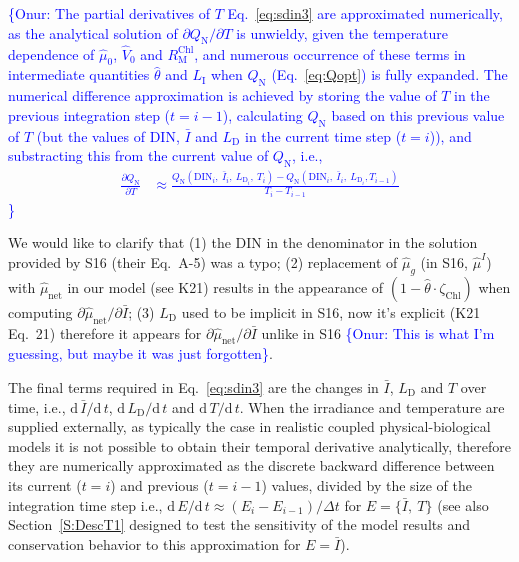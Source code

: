\documentclass[gmd, manuscript]{copernicus}
\newcommand{\onur}[1]{\textcolor{blue}{\{Onur: #1\}}}
\begin{document}
\onur{
The partial derivatives of $T$ Eq.~\eqref{eq:sdin3} are approximated numerically, as the analytical solution of $\partial Q_{\text{N}}/\partial T$ is unwieldy, given the temperature dependence of $\hat{\mu}_0$,  $\hat{V}_0$ and $R_{\text{M}}^{\text{Chl}}$, and numerous occurrence of these terms in intermediate quantities $\hat{\theta}$ and $L_{\text{I}}$ when $Q_{\text{N}}$ (Eq.~\ref{eq:Qopt}) is fully expanded. The numerical difference approximation is achieved by storing the value of $T$ in the previous integration step ($t=i-1$), calculating $Q_{\text{N}}$ based on this previous value of $T$ (but the values of DIN, $\bar{I}$ and $L_{\text{D}}$ in the current time step ($t=i$)), and substracting this from the current value of $Q_{\text{N}}$, i.e.,
\begin{align}
 \frac{\partial Q_{\text{N}}}{\partial T} & \approx
 \frac{Q_{\text{N}}(\text{DIN}_{i},\ \bar{I}_{i},\ L_{\text{D}_i},\ T_{i}) - Q_{\text{N}}(\text{DIN}_{i},\ \bar{I}_{i},\ L_{\text{D}_i},T_{i-1})} {T_{i} - T_{i-1}} 
\end{align}
}

We would like to clarify that (1) the DIN in the denominator in the solution provided by S16 (their Eq.~A-5) was a typo; (2) replacement of $\hat{\mu}_g$ (in S16, $\hat{\mu}^I$) with $\hat{\mu}_{\text{net}}$ in our model (see K21) results in the appearance of $(1-\hat{\theta} \cdot \zeta_{\text{Chl}})$ when computing $\partial \hat{\mu}_{\text{net}} / \partial \bar{I}$; (3) $L_{\text{D}}$ used to be implicit in S16, now it's explicit (K21 Eq.~21) therefore it appears for $\partial\hat{\mu}_{\text{net}} / \partial \bar{I}$ unlike in S16 \onur{This is what I'm guessing, but maybe it was just forgotten}. %

The final terms required in Eq.~\eqref{eq:sdin3} are the changes in $\bar{I}$, $L_{\text{D}}$ and $T$ over time, i.e., $\text{d}\,\bar{I} / \text{d}\,t$, $\text{d}\,L_{\text{D}} / \text{d}\,t$ 
and $\text{d}\,T / \text{d}\,t$. 
When the irradiance and temperature are supplied externally, as typically the case in realistic coupled physical-biological models it is not possible to obtain their temporal derivative analytically, therefore they are numerically approximated as the discrete backward difference between its current ($t=i$) and previous ($t=i-1$) values, divided by the size of the integration time step i.e., $\text{d}\, E / \text{d}\, t \approx (E_{i} - E_{i-1}) / \Delta t$ for $E=\{\bar{I},\ T\}$ (see also Section~\ref{S:DescT1} designed to test the sensitivity of the model results and conservation behavior to this approximation for $E=\bar{I}$).
\end{document}
